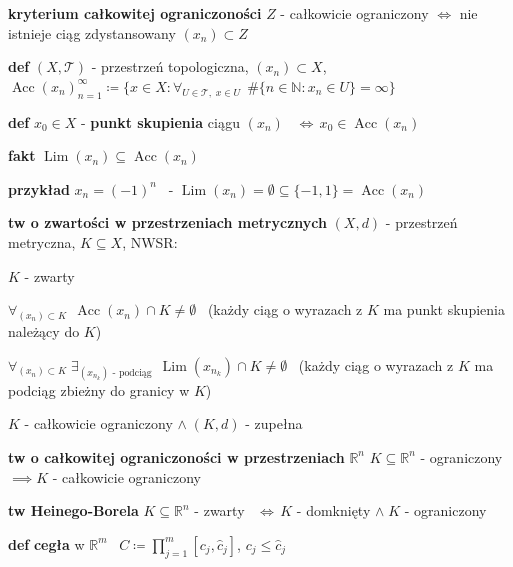 \documentclass[a4paper,12pt]{article}
\begin{document}
\bigskip
\textbf{kryterium całkowitej ograniczoności} \; \(Z\) - całkowicie ograniczony \(\iff\) nie istnieje ciąg zdystansowany \((x_n) \subset Z\)

\newpage
{}

\bigskip
\textbf{def} \; \((X, \mathcal{T})\) - przestrzeń topologiczna, \; \((x_n) \subset X\), \; \(\operatorname{Acc}(x_n)_{n=1}^{\infty} \coloneqq \{x \in X : \forall_{U \in \mathcal{T}, \; x \in U} \;\, \#\{n \in \mathbb{N} : x_n \in U\} = \infty\}\)

\smallskip
\textbf{def} \; \(x_0 \in X\) - \textbf{punkt skupienia} ciągu \((x_n)\) \, \(\iff \, x_0 \in \operatorname{Acc}(x_n)\)

\smallskip
\textbf{fakt} \; \(\operatorname{Lim}(x_n) \subseteq \operatorname{Acc}(x_n)\)

\bigskip
\begin{logbox}
\textbf{przykład} \; \(x_n = (-1)^n\) \, - \(\operatorname{Lim}(x_n) = \emptyset \subseteq \{-1, 1\} = \operatorname{Acc}(x_n)\)
\end{logbox}

\bigskip
\textbf{tw o zwartości w przestrzeniach metrycznych} \; \((X, d)\) - przestrzeń metryczna, \; \(K \subseteq X\), \; NWSR:
\begin{podpunkty}
    \item \(K\) - zwarty
    \item \(\forall_{(x_n) \subset K} \;\, \operatorname{Acc}(x_n) \cap K \neq \emptyset\) \, (każdy ciąg o wyrazach z $K$ ma punkt skupienia należący do $K$)
    \item \(\forall_{(x_n) \subset K} \; \exists_{(x_{n_k}) \text{ - podciąg}} \;\, \operatorname{Lim}(x_{n_k}) \cap K \neq \emptyset\) \, (każdy ciąg o wyrazach z $K$ ma podciąg zbieżny do granicy w $K$)
    \item \(K\) - całkowicie ograniczony \(\land \; (K, d)\) - zupełna
\end{podpunkty}

\bigskip
\textbf{tw o całkowitej ograniczoności w przestrzeniach} \(\mathbb{R}^n\) \; \(K \subseteq \mathbb{R}^n\) - ograniczony \(\implies K\) - całkowicie ograniczony

\bigskip
\textbf{tw Heinego-Borela} \; \(K \subseteq \mathbb{R}^n\) - zwarty \, \(\iff \, K\) - domknięty \(\land \; K\) - ograniczony


\bigskip
\bigskip
{}

\bigskip
{}

\bigskip
\textbf{def} \; \textbf{cegła} w \(\mathbb{R}^m\) \, \(C \coloneqq \prod_{j=1}^{m} [c_j, \hat{c}_j]\), \; \(c_j \leq \hat{c}_j\)
\end{document}
